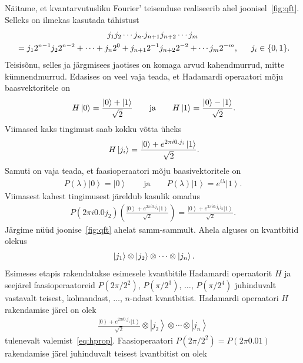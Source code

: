 \documentclass[12pt]{report}
\def\paren#1{\left(#1\right)}
\def\ket#1{\left|#1\right>}
\begin{document}
Näitame, et kvantarvutusliku Fourier' teisenduse realiseerib ahel joonisel~\ref{fig:qft}.
Selleks on ilmekas kasutada tähistust
\begin{multline}
    j_1j_2\cdots j_n.j_{n+1}j_{n+2}\cdots j_m \\
    = j_1 2^{n-1} j_2 2^{n-2} + \cdots + j_n 2^0 + j_{n+1} 2^{-1} j_{n+2} 2^{-2} + \cdots j_m 2^{-m} \rlap{,}
    \qquad j_i \in \{0, 1\} \rlap{.}
\end{multline}
Teisisõnu, selles ja järgmisees jaotises on komaga arvud kahendmurrud, mitte kümnendmurrud.
Edasises on veel vaja teada, et Hadamardi operaatori mõju baasvektoritele on
\begin{align}
    H\ket{0} = \frac{\ket{0} + \ket{1}}{\sqrt{2}}
    \qquad\text{ja}\qquad
    H\ket{1} = \frac{\ket{0} - \ket{1}}{\sqrt{2}} \rlap{.}
\end{align}
Viimased kaks tingimust saab kokku võtta üheks
\begin{align}\label{eq:hprop}
    H\ket{j_i} = \frac{\ket{0} + e^{2\pi i0.j_i}\ket{1}}{\sqrt{2}}\rlap{.}
\end{align}
Samuti on vaja teada, et faasioperaatori mõju baasivektoritele on
\begin{align}
    P(\lambda)\ket{0} = \ket{0}
    \qquad\text{ja}\qquad
    P(\lambda)\ket{1} = e^{i\lambda}\ket{1} .
\end{align}
Viimasest kahest tingimusest järeldub kasulik omadus
\begin{align}\label{eq:phaseprop}
    P(2\pi i0.0j_2)\paren{\frac{\ket{0} + e^{2\pi i 0.j_1} \ket{1}}{\sqrt{2}}}
    = \frac{\ket{0}+e^{2\pi i0.j_1j_2}\ket{1}}{\sqrt{2}} .
\end{align}
Järgime nüüd joonise~\ref{fig:qft} ahelat samm-sammult.
Ahela alguses on kvantbitid olekus
\begin{align}
    \ket{j_1} \otimes \ket{j_2} \otimes \cdots \otimes \ket{j_n} \rlap{.}
\end{align}
Esimeses etapis rakendatakse esimesele kvantbitile Hadamardi operaatorit \(H\) ja seejärel faasioperaatoreid \(P(2\pi/2^2)\), \(P(\pi/2^3)\), \(\ldots\), \(P(\pi/2^4)\) juhinduvalt vastavalt teisest, kolmandast, \(\ldots\), \(n\)-ndast kvantbitist.
Hadamardi operaatori \(H\) rakendamise järel on olek
\begin{align}
    \frac{\ket{0} + e^{2\pi i0.j_1}\ket{1}}{\sqrt{2}} \otimes \ket{j_2} \otimes \cdots \otimes \ket{j_n}
\end{align}
tulenevalt valemist~\eqref{eq:hprop}.
Faasioperaatori \(P(2\pi/2^2) = P(2\pi0.01)\) rakendamise järel juhinduvalt teisest kvantbitist on olek
\end{document}
